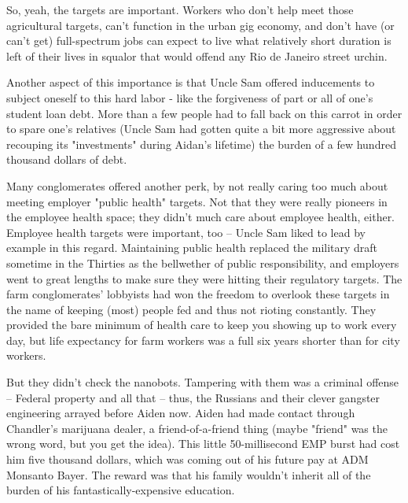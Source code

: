\documentclass[11pt]{book}
\begin{document}
	So, yeah, the targets are important. Workers who don't help meet those agricultural targets, can't function in the urban gig economy, and don't have (or can't get) full-spectrum jobs can expect to live what relatively short duration is left of their lives in squalor that would offend any Rio de Janeiro street urchin.
	
	Another aspect of this importance is that Uncle Sam offered inducements to subject oneself to this hard labor - like the forgiveness of part or all of one's student loan debt. More than a few people had to fall back on this carrot in order to spare one's relatives (Uncle Sam had gotten quite a bit more aggressive about recouping its "investments" during Aidan's lifetime) the burden of a few hundred thousand dollars of debt.
	
	Many conglomerates offered another perk, by not really caring too much about meeting employer "public health" targets. Not that they were really pioneers in the employee health space; they didn't much care about employee health, either. Employee health targets were important, too -- Uncle Sam liked to lead by example in this regard. Maintaining public health replaced the military draft sometime in the Thirties as the bellwether of public responsibility, and employers went to great lengths to make sure they were hitting their regulatory targets. The farm conglomerates' lobbyists had won the freedom to overlook these targets in the name of keeping (most) people fed and thus not rioting constantly. They provided the bare minimum of health care to keep you showing up to work every day, but life expectancy for farm workers was a full six years shorter than for city workers. 
	
	But they didn't check the nanobots. Tampering with them was a criminal offense -- Federal property and all that -- thus, the Russians and their clever gangster engineering arrayed before Aiden now. Aiden had made contact through Chandler's marijuana dealer, a friend-of-a-friend thing (maybe "friend" was the wrong word, but you get the idea). This little 50-millisecond EMP burst had cost him five thousand dollars, which was coming out of his future pay at ADM Monsanto Bayer. The reward was that his family wouldn't inherit all of the burden of his fantastically-expensive education.
	
	
\end{document}
